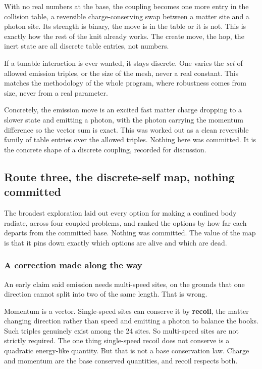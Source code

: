 \begin{principle}
With no real numbers at the base, the coupling becomes one more entry in the collision table, a reversible charge-conserving swap between a matter site and a photon site. Its strength is binary, the move is in the table or it is not. This is exactly how the rest of the knit already works. The create move, the hop, the inert state are all discrete table entries, not numbers.
\end{principle}

If a tunable interaction is ever wanted, it stays discrete. One varies the \emph{set} of allowed emission triples, or the size of the mesh, never a real constant. This matches the methodology of the whole program, where robustness comes from size, never from a real parameter.

Concretely, the emission move is an excited fast matter charge dropping to a slower state and emitting a photon, with the photon carrying the momentum difference so the vector sum is exact. This was worked out as a clean reversible family of table entries over the allowed triples. Nothing here was committed. It is the concrete shape of a discrete coupling, recorded for discussion.

\subsection{Route three, the discrete-self map, nothing committed}

The broadest exploration laid out every option for making a confined body radiate, across four coupled problems, and ranked the options by how far each departs from the committed base. Nothing was committed. The value of the map is that it pins down exactly which options are alive and which are dead.

\subsubsection{A correction made along the way}

An early claim said emission needs multi-speed sites, on the grounds that one direction cannot split into two of the same length. That is wrong.

Momentum is a vector. Single-speed sites can conserve it by \textbf{recoil}, the matter changing direction rather than speed and emitting a photon to balance the books. Such triples genuinely exist among the 24 sites. So multi-speed sites are not strictly required. The one thing single-speed recoil does not conserve is a quadratic energy-like quantity. But that is not a base conservation law. Charge and momentum are the base conserved quantities, and recoil respects both.

